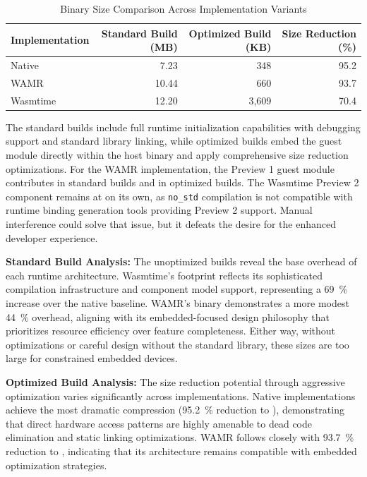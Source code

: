 \begin{table}[H]
    \centering
    \caption{Binary Size Comparison Across Implementation Variants}
    \label{tab:binary-sizes}
    \begin{tabular}{lrrr}
    \toprule
    \textbf{Implementation} & \textbf{Standard Build (MB)} & \textbf{Optimized Build (KB)} & \textbf{Size Reduction (\%)} \\
    \midrule
    Native              & 7.23  & 348   & 95.2 \\
    WAMR                & 10.44 & 660   & 93.7 \\
    Wasmtime            & 12.20 & 3,609 & 70.4 \\
    \bottomrule
    \end{tabular}
\end{table}

The standard builds include full runtime initialization capabilities with debugging support and standard library linking, while optimized builds embed the guest module directly within the host binary and apply comprehensive size reduction optimizations. For the WAMR implementation, the Preview 1 guest module contributes  in standard builds and  in optimized builds. The Wasmtime Preview 2 component remains at  on its own, as \texttt{no\_std} compilation is not compatible with runtime binding generation tools providing Preview 2 support. Manual interference could solve that issue, but it defeats the desire for the enhanced developer experience.

\textbf{Standard Build Analysis:} The unoptimized builds reveal the base overhead of each runtime architecture. Wasmtime's  footprint reflects its sophisticated compilation infrastructure and component model support, representing a \SI[round-precision=1]{69}{\percent} increase over the native baseline. WAMR's  binary demonstrates a more modest \SI[round-precision=1]{44}{\percent} overhead, aligning with its embedded-focused design philosophy that prioritizes resource efficiency over feature completeness. Either way, without optimizations or careful design without the standard library, these sizes are too large for constrained embedded devices.

\textbf{Optimized Build Analysis:} The size reduction potential through aggressive optimization varies significantly across implementations. Native implementations achieve the most dramatic compression (\SI[round-precision=1]{95.2}{\percent} reduction to ), demonstrating that direct hardware access patterns are highly amenable to dead code elimination and static linking optimizations. WAMR follows closely with \SI[round-precision=1]{93.7}{\percent} reduction to , indicating that its architecture remains compatible with embedded optimization strategies.

